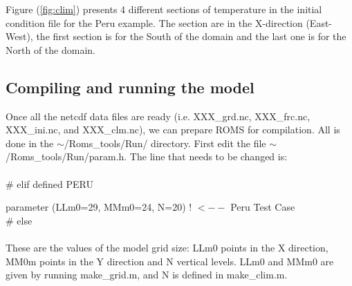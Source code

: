 Figure (\ref{fig:clim}) presents 4 different sections
of temperature in the initial condition file for the 
Peru example. The section are in the X-direction (East-West), 
the first section is for the South of the domain and the last one 
is for the North of the domain.

\subsection{Compiling and running the model}

Once all the netcdf data files are ready (i.e. XXX\_grd.nc,
XXX\_frc.nc, XXX\_ini.nc, and XXX\_clm.nc), we can 
prepare ROMS for compilation. All is done in the 
 $\sim$/Roms\_tools/Run/ directory. First edit the file 
 $\sim$/Roms\_tools/Run/param.h.
 The line that needs to be changed is:\\ 
 \\
\#  elif defined PERU

      parameter (LLm0=29,  MMm0=24, N=20)  ! $<--$ Peru Test Case\\
\#  else\\
\\
These are the values of the model grid size: LLm0 points in the X 
direction, MM0m points in the Y direction and N vertical levels.
LLm0 and MMm0 are given by running make\_grid.m, and N is
defined in make\_clim.m.

